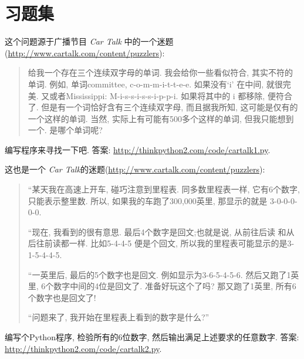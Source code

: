 \documentclass[10pt]{book}
\begin{document}
\section{习题集}

\begin{exercise}

这个问题源于广播节目 {\em Car Talk} 中的一个迷题
(\url{http://www.cartalk.com/content/puzzlers}):

\begin{quote}
给我一个存在三个连续双字母的单词. 
我会给你一些看似符合, 其实不符的单词. 
例如, 单词committee,  c-o-m-m-i-t-t-e-e. 
如果没有`i' 在中间, 就很完美. 
又或者Mississippi: M-i-s-s-i-s-s-i-p-p-i.
如果将其中的 i 都移除, 便符合了. 
但是有一个词恰好含有三个连续双字母, 而且据我所知, 
这可能是仅有的一个这样的单词. 
当然, 实际上有可能有500多个这样的单词, 但我只能想到一个. 
是哪个单词呢?
\end{quote}

编写程序来寻找一下吧. 
答案: \url{http://thinkpython2.com/code/cartalk1.py}.

\end{exercise}


\begin{exercise}
这也是一个 {\em Car Talk}的迷题(\url{http://www.cartalk.com/content/puzzlers}):

\begin{quote}

``某天我在高速上开车, 碰巧注意到里程表. 
同多数里程表一样, 它有6个数字, 只能表示整里数. 
所以, 如果我的车跑了300,000英里, 那显示的就是
3-0-0-0-0-0.

``现在, 我看到的很有意思. 最后4个数字是回文;也就是说, 从前往后读
和从后往前读都一样. 比如5-4-4-5 便是个回文, 
所以我的里程表可能显示的是3-1-5-4-4-5.

``一英里后, 最后的5个数字也是回文. 
例如显示为3-6-5-4-5-6. 然后又跑了1英里, 6个数字中间的4位是回文了. 
准备好玩这个了吗?  那又跑了1英里, 所有6个数字也是回文了!

``问题来了, 我开始在里程表上看到的数字是什么?''
\end{quote}

编写个Python程序, 检验所有的6位数字, 然后输出满足上述要求的任意数字. 
答案: \url{http://thinkpython2.com/code/cartalk2.py}.

\end{exercise}
\end{document}
